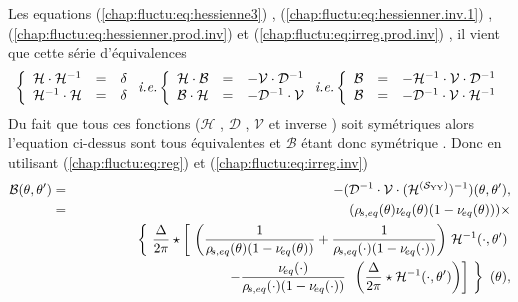 \medskip

Les equations (\ref{chap:fluctu:eq:hessienne3}) , (\ref{chap:fluctu:eq:hessienner.inv.1}) , (\ref{chap:fluctu:eq:hessienner.prod.inv}) et (\ref{chap:fluctu:eq:irreg.prod.inv}) , il vient que cette série d'équivalences
\begin{eqnarray*}
	\left \{\begin{array}{rcl} \mathcal{H}\cdot\mathcal{H}^{-1} & =& \delta \\  \mathcal{H}^{-1}\cdot \mathcal{H}& =& \delta  \end{array} \right.  \mbox{\emph{i.e.}}	 \left \{\begin{array}{rcl} \mathcal{H}\cdot\mathcal{B} & =& - \mathcal{V}\cdot\mathcal{D}^{-1} \\  \mathcal{B}\cdot\mathcal{H} & =& - \mathcal{D}^{-1}\cdot\mathcal{V}  \end{array} \right. \mbox{\emph{i.e.}} \left \{\begin{array}{rcl} \mathcal{B} & =& - \mathcal{H}^{-1}\cdot\mathcal{V}\cdot \mathcal{D}^{-1}  \\  \mathcal{B} & =& - \mathcal{D}^{-1}\cdot\mathcal{V}\cdot \mathcal{H}^{-1}  \end{array} \right.	
\end{eqnarray*}
Du fait que tous ces fonctions ($\mathcal{H}$ , $\mathcal{D}$ , $\mathcal{V}$ et inverse ) soit symétriques alors l'equation ci-dessus sont tous équivalentes et $\mathcal{B}$ étant donc symétrique .
Donc en utilisant (\ref{chap:fluctu:eq:reg}) et (\ref{chap:fluctu:eq:irreg.inv}) 
\begin{eqnarray}
	\mathcal{B}(\theta , \theta ' )  & = & - (\mathcal{D}^{-1}\cdot\mathcal{V}\cdot (\mathcal{H}^{(\mathcal{S}_{\mathrm{YY}})})^{-1})(\theta , \theta') 	, \label{chap:fluctu:eq:B.1}\\
	& = & 	(\rho_{\! s , eq}(\theta) \nu_{\! eq}(\theta) (1 -  \nu_{\! eq}(\theta) )) \times  \notag\\
	&& ~~~~~~~~~~~~~\left \{  \frac{\Delta}{2\pi} \star  \left [ \left (  \frac{1}{\rho_{\! s, eq}(\theta)  (1 - \nu_{\! eq}(\theta)  )} +  \frac{1}{\rho_{\! s, eq}(\cdot) (1 - \nu_{\! eq} (\cdot )  )}\right )  \, \mathcal{H}^{-1}( \cdot , \theta ' )   \right. \right .\notag\\
	&&  ~~~~~~~~~~~~~~~~~~~~~~~~~\left . \left .   -  \frac{\nu_{\! eq}(\cdot)}{\rho_{\! s, eq}(\cdot) ( 1 - \nu_{\! eq}(\cdot) )}  \, \left ( \frac{\Delta}{2\pi} \star \mathcal{H}^{-1}( \cdot , \theta ' )   \right )  \right ] \right \} (\theta) \notag,
\end{eqnarray}
